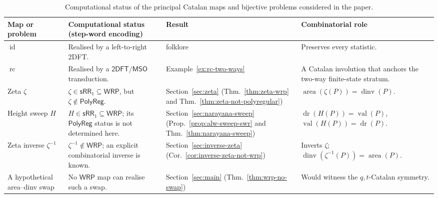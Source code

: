 \documentclass[11pt]{article}
\theoremstyle{definition}
\newcommand{\WRP}{\mathsf{WRP}}
\newcommand{\SWR}{\mathsf{sRR}_1}
\newcommand{\TDFT}{\mathsf{2DFT}}
\newcommand{\MSO}{\mathsf{MSO}}
\newcommand{\area}{\operatorname{area}}
\newcommand{\dinv}{\operatorname{dinv}}
\newcommand{\val}{\operatorname{val}}
\newcommand{\dr}{\operatorname{dr}}
\newcommand{\polyreg}{\mathsf{PolyReg}}
\newcommand{\id}{\operatorname{id}}
\newcommand{\rc}{\operatorname{rc}}
\begin{document}
\begin{table}[ht]
\centering
\small
\renewcommand{\arraystretch}{1.25}
\begin{tabularx}{\textwidth}{@{}>{\raggedright\arraybackslash}p{}
                                   >{\raggedright\arraybackslash}X
                                   >{\raggedright\arraybackslash}p{}
                                   >{\raggedright\arraybackslash}X@{}}
\toprule
Map or problem & Computational status (step-word encoding) & Result &
  Combinatorial role \\
\midrule
$\id$ & Realised by a left-to-right 2DFT. & folklore &
  Preserves every statistic. \\
$\rc$ & Realised by a $\TDFT/\MSO$ transduction. &
  Example~\ref{ex:rc-two-ways} &
  A Catalan involution that anchors the two-way finite-state stratum. \\
Zeta $\zeta$ &
  $\zeta\in\SWR\subseteq\WRP$, but $\zeta\notin\polyreg$. &
  Section~\ref{sec:zeta}
  (Thm.~\ref{thm:zeta-wrp} and
  Thm.~\ref{thm:zeta-not-polyregular}) &
  $\area(\zeta(P))=\dinv(P)$. \\
Height sweep $H$ &
  $H\in\SWR\subseteq\WRP$; its $\polyreg$ status is not determined here. &
  Section~\ref{sec:narayana-sweep}
  (Prop.~\ref{prop:alw-sweep-swr} and
  Thm.~\ref{thm:narayana-sweep}) &
  $\dr(H(P))=\val(P)$, $\val(H(P))=\dr(P)$. \\
Zeta inverse $\zeta^{-1}$ &
  $\zeta^{-1}\notin\WRP$; an explicit combinatorial inverse is known. &
  Section~\ref{sec:inverse-zeta}
  (Cor.~\ref{cor:inverse-zeta-not-wrp}) &
  Inverts $\zeta$; $\dinv(\zeta^{-1}(P))=\area(P)$. \\
A hypothetical area--dinv swap &
  No $\WRP$ map can realise such a swap. &
  Section~\ref{sec:main} (Thm.~\ref{thm:wrp-no-swap}) &
  Would witness the $q,t$-Catalan symmetry. \\
\bottomrule
\end{tabularx}
\caption{Computational status of the principal Catalan maps and bijective
problems considered in the paper.}
\label{tab:landscape}
\end{table}
\end{document}
